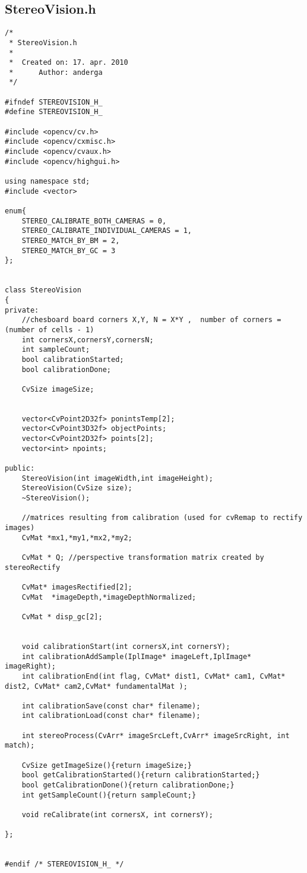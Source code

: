 \subsection{StereoVision.h}

\begin{lstlisting}
/*
 * StereoVision.h
 *
 *  Created on: 17. apr. 2010
 *      Author: anderga
 */

#ifndef STEREOVISION_H_
#define STEREOVISION_H_

#include <opencv/cv.h>
#include <opencv/cxmisc.h>
#include <opencv/cvaux.h>
#include <opencv/highgui.h>

using namespace std;
#include <vector>

enum{
	STEREO_CALIBRATE_BOTH_CAMERAS = 0,
	STEREO_CALIBRATE_INDIVIDUAL_CAMERAS = 1,
	STEREO_MATCH_BY_BM = 2,
	STEREO_MATCH_BY_GC = 3
};


class StereoVision
{
private:
    //chesboard board corners X,Y, N = X*Y ,  number of corners = (number of cells - 1)
    int cornersX,cornersY,cornersN;
    int sampleCount;
    bool calibrationStarted;
    bool calibrationDone;

    CvSize imageSize;


    vector<CvPoint2D32f> ponintsTemp[2];
    vector<CvPoint3D32f> objectPoints;
    vector<CvPoint2D32f> points[2];
    vector<int> npoints;

public:
    StereoVision(int imageWidth,int imageHeight);
    StereoVision(CvSize size);
    ~StereoVision();

    //matrices resulting from calibration (used for cvRemap to rectify images)
    CvMat *mx1,*my1,*mx2,*my2;

    CvMat * Q; //perspective transformation matrix created by stereoRectify

    CvMat* imagesRectified[2];
    CvMat  *imageDepth,*imageDepthNormalized;

    CvMat * disp_gc[2];


    void calibrationStart(int cornersX,int cornersY);
    int calibrationAddSample(IplImage* imageLeft,IplImage* imageRight);
    int calibrationEnd(int flag, CvMat* dist1, CvMat* cam1, CvMat* dist2, CvMat* cam2,CvMat* fundamentalMat );

    int calibrationSave(const char* filename);
    int calibrationLoad(const char* filename);

    int stereoProcess(CvArr* imageSrcLeft,CvArr* imageSrcRight, int match);

    CvSize getImageSize(){return imageSize;}
    bool getCalibrationStarted(){return calibrationStarted;}
    bool getCalibrationDone(){return calibrationDone;}
    int getSampleCount(){return sampleCount;}

    void reCalibrate(int cornersX, int cornersY);

};


#endif /* STEREOVISION_H_ */

\end{lstlisting}

